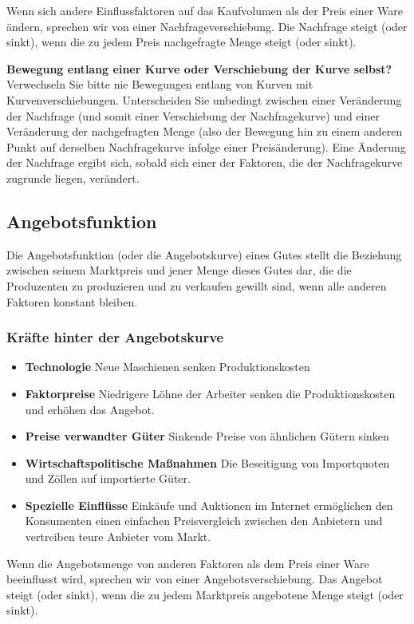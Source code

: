 \documentclass[10pt]{scrartcl}
\begin{document}
Wenn sich andere Einflussfaktoren auf das Kaufvolumen als der Preis einer Ware ändern, sprechen wir von einer Nachfrageverschiebung. Die Nachfrage steigt (oder sinkt), wenn die zu jedem Preis nachgefragte Menge steigt (oder sinkt). 

{\bf Bewegung entlang einer Kurve oder Verschiebung der Kurve selbst? }\\
Verwechseln Sie bitte nie Bewegungen entlang von Kurven mit Kurvenverschiebungen. Unterscheiden Sie unbedingt zwischen einer Veränderung der Nachfrage (und somit einer Verschiebung der Nachfragekurve) und einer Veränderung der nachgefragten Menge (also der Bewegung hin zu einem  anderen Punkt auf derselben Nachfragekurve infolge einer Preisänderung).  Eine Änderung der Nachfrage ergibt sich, sobald sich einer der Faktoren, die der  Nachfragekurve zugrunde liegen, verändert.
\subsection{Angebotsfunktion}
Die Angebotsfunktion (oder die Angebotskurve) eines Gutes stellt die Beziehung zwischen seinem Marktpreis und jener Menge dieses Gutes dar, die die Produzenten zu produzieren und zu verkaufen gewillt sind,  wenn alle anderen Faktoren konstant bleiben.
\subsubsection{Kräfte hinter der Angebotskurve}
\begin{itemize}
\item {\bf Technologie } Neue Maschienen senken Produktionskosten
\item {\bf Faktorpreise } Niedrigere Löhne der Arbeiter senken die Produktionskosten und erhöhen das Angebot.
\item {\bf Preise verwandter Güter } Sinkende Preise von ähnlichen Gütern sinken
\item {\bf Wirtschaftspolitische Maßnahmen } Die Beseitigung von Importquoten und Zöllen auf importierte Güter.
\item {\bf Spezielle Einflüsse } Einkäufe und Auktionen im Internet ermöglichen den Konsumenten einen einfachen Preisvergleich zwischen den Anbietern und vertreiben teure Anbieter vom Markt.
\end{itemize}
Wenn die Angebotsmenge von anderen Faktoren als dem Preis einer Ware beeinflusst wird, sprechen wir von einer Angebotsverschiebung. Das Angebot steigt (oder sinkt), wenn die zu jedem Marktpreis angebotene Menge steigt (oder sinkt).
\end{document}
